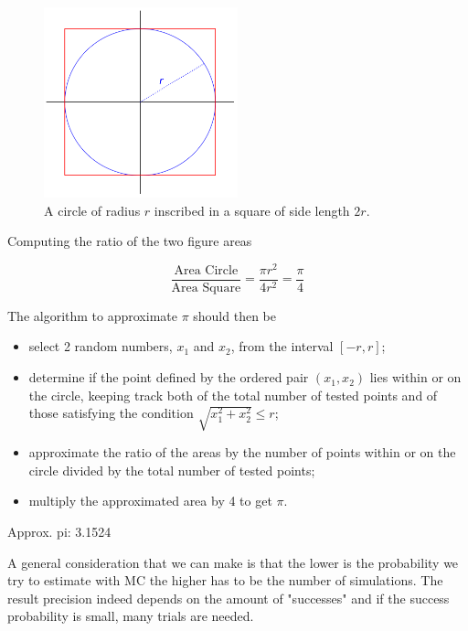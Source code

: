 \begin{figure}[htb]
\centering
\includegraphics[width=0.5\textwidth]{figures/circle_inscribed}
\caption{A circle of radius $r$ inscribed in a square of side length $2r$.}
\label{fig:circle_inscribed}
\end{figure}

Computing the ratio of the two figure areas

\begin{equation}
\frac{\textrm{Area Circle}}{\textrm{Area Square}} = \frac{\pi r^2}{4r^2} = \frac{\pi}{4} 
\end{equation}

The algorithm to approximate $\pi$ should then be

\begin{itemize}
\item select 2 random numbers, $x_1$ and $x_2$, from the interval
$[-r,r]$; 
\item determine if the point defined by the ordered pair $(x_1, x_2)$ lies within or on the circle, keeping track both of the total number of tested points and of those satisfying the condition $\sqrt{x_1^2 + x_2^2}\leq r$; 
\item approximate the ratio of the areas by the number of points within or on the circle divided by the total number of tested points; 
\item multiply the approximated area by 4 to get $\pi$.
\end{itemize}

\begin{ioutput}
Approx. pi: 3.1524
\end{ioutput}

A general consideration that we can make is that the lower is the probability we try to estimate with MC the higher has to be the number of simulations. 
The result precision indeed depends on the amount of "successes" and if the success probability is small, many trials are needed. 

